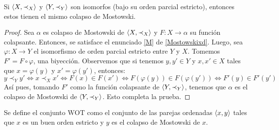 \begin{prop}\label{p1}
Si $\langle X,\prec_X\rangle$ y $\langle Y,\prec_Y\rangle$ son isomorfos (bajo su orden parcial estricto), entonces estos tienen el mismo colapso de Mostowski.
\end{prop}
\begin{proof}
Sea $\alpha$ es colapso de Mostowski de $\langle X,\prec_X\rangle$ y $F:X\longrightarrow \alpha$ su función colapsante. Entonces, se satisface el enunciado {\eqref{M}} de {\ref{Mostowskixd}}. Luego, sea $\varphi:X\longrightarrow Y$ el isomorfismo de orden parcial estricto entre $Y$ y $X$.
Tomemos $F'=F\circ\varphi$, una biyección. Observemos que si tenemos $y,y'\in Y$ y $x,x'\in X$ tales que $x=\varphi(y)$ y $x'=\varphi(y')$, entonces:
\[y\prec_Y y'\Longleftrightarrow x\prec_X x'\Longleftrightarrow F(x)\in F(x')\Longleftrightarrow F(\varphi(y))\in F(\varphi(y'))\Longleftrightarrow F'(y)\in F'(y')\]
Así pues, tomando $F'$ como la función colapsante de $\langle Y,\prec_Y\rangle$, tenemos que $\alpha$ es el colapso de Mostowski de $\langle Y,\prec_Y\rangle$. Esto completa la prueba.
\end{proof}

\begin{defn}\label{d2}
Se define el conjunto $\text{WOT}$ como el conjunto de las parejas ordenadas $\langle x,y\rangle$ tales que $x$ es un buen orden estricto y $y$ es el colapso de Mostowski de $x$.
\end{defn}

